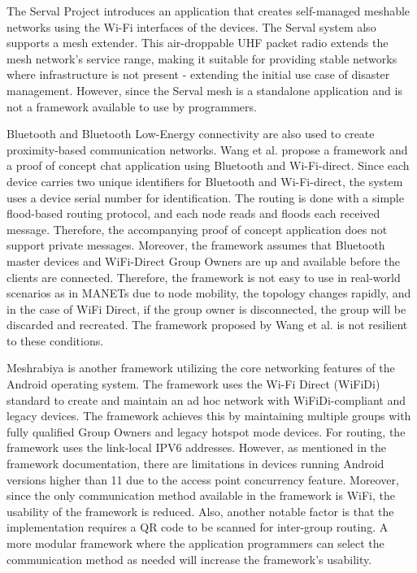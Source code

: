 The Serval Project introduces an application that creates self-managed meshable
networks using the Wi-Fi interfaces of the devices\cite{gardner2013}. The
Serval system also supports a mesh extender\cite{gardner2013}. This
air-droppable UHF packet radio extends the mesh network's service range, making
it suitable for providing stable networks where infrastructure is not present -
extending the initial use case of disaster management. However, since the
Serval mesh is a standalone application and is not a framework available to use
by programmers.

Bluetooth and Bluetooth Low-Energy connectivity are also used to create
proximity-based communication networks. Wang et al. propose a  framework and a
proof of concept chat application using Bluetooth and
Wi-Fi-direct\cite{wang2015}. Since each device carries two unique identifiers
for Bluetooth and Wi-Fi-direct, the system uses a device serial number for
identification. The routing is done with a simple flood-based routing protocol,
and each node reads and floods each received message\cite{wang2015}. Therefore,
the accompanying proof of concept application does not support private
messages. Moreover, the framework assumes that Bluetooth master devices and
WiFi-Direct Group Owners are up and available before the clients are connected.
Therefore, the framework is not easy to use in real-world scenarios as in
MANETs due to node mobility, the topology changes rapidly, and in the case of
WiFi Direct, if the group owner is disconnected, the group will be discarded
and recreated\cite{raza2016}. The framework proposed by Wang et al. is not
resilient to these conditions\cite{wang2015}.

Meshrabiya\cite{meshrabiya} is another framework utilizing the core networking
features of the Android operating system. The framework uses the Wi-Fi Direct
(WiFiDi) standard to create and maintain an ad hoc network with
WiFiDi-compliant and legacy devices. The framework achieves this by maintaining
multiple groups with fully qualified Group Owners and legacy hotspot mode
devices. For routing, the framework uses the link-local IPV6 addresses.
However, as mentioned in the framework documentation\cite{meshrabiya}, there are
limitations in devices running Android versions higher than 11 due to the
access point concurrency feature. Moreover, since the only communication method
available in the framework is WiFi, the usability of the framework is reduced.
Also, another notable factor is that the implementation requires a QR code to
be scanned for inter-group routing.  A more modular framework where the
application programmers can select the communication method as needed will
increase the framework's usability.

